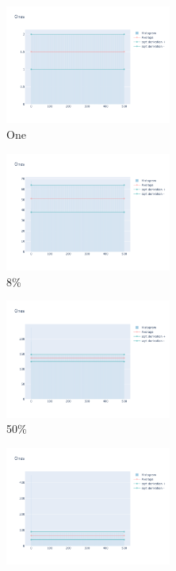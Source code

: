 \documentclass[12pt, fleqn]{report}                             %
\theoremstyle{break}                                            %
\begin{document}
      \begin{figure}[ht!]
        \centering
        \begin{subfigure}[b]{0.4\linewidth}
          \includegraphics[width=0.6\textwidth]{Images/38/dia-a.png}
          \caption{One}
        \end{subfigure}
        \begin{subfigure}[b]{0.4\linewidth}
          \includegraphics[width=0.6\textwidth]{Images/38/dia-b.png}
          \caption{8\%}
        \end{subfigure}
        \begin{subfigure}[b]{0.4\linewidth}
          \includegraphics[width=0.6\textwidth]{Images/38/dia-c.png}
          \caption{50\%}
        \end{subfigure}
        \begin{subfigure}[b]{0.4\linewidth}
          \includegraphics[width=0.6\textwidth]{Images/38/dia-d.png}

\end{subfigure}
\end{figure}
\end{document}
